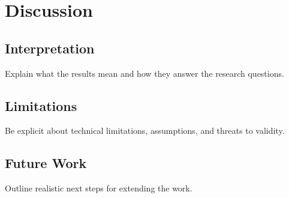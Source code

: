 \chapter{Discussion}

\section{Interpretation}
Explain what the results mean and how they answer the research questions.

\section{Limitations}
Be explicit about technical limitations, assumptions, and threats to validity.

\section{Future Work}
Outline realistic next steps for extending the work.
